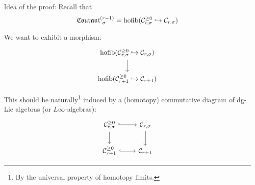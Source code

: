 \documentclass[beamer,10pt]{standalone}
\begin{document}
\begin{frame}{Idea of the proof:}
	Recall that $$\Courant[\sigma]{r-1} = \hofib(\mathcal{C}_{r,\sigma}^{\geq 0} \hookrightarrow \mathcal{C}_{r,\sigma}) $$
	\pause
	\vfill

	We want to exhibit a morphism:
		\begin{displaymath}
			\begin{tikzcd}[ampersand replacement=\&]
				\hofib(\mathcal{C}_{r,\sigma}^{\geq 0} \hookrightarrow \mathcal{C}_{r,\sigma}) \ar[d]
				\\
				\hofib(\mathcal{C}_{r+1}^{\geq 0} \hookrightarrow \mathcal{C}_{r+1})
			\end{tikzcd}
		\end{displaymath}
	\pause
	\vfill

	This should be naturally\footnote{By the universal property of homotopy limits.} induced by a (homotopy) commutative diagram of dg-Lie algebras (or $L\infty$-algebras):
		\begin{displaymath}
			\begin{tikzcd}[ampersand replacement=\&]
				\mathcal{C}_{r,\sigma}^{\geq 0} \ar[r,hook] \ar[d ]
				\& \mathcal{C}_{r,\sigma} \ar[d, ]
				\\
				\mathcal{C}_{r+1}^{\geq 0} \ar[r,hook] \& \mathcal{C}_{r+1} 
			\end{tikzcd}
		\end{displaymath}
	
\end{frame}
\note[itemize]
{
	\item 
	\item 
}
\end{document}
